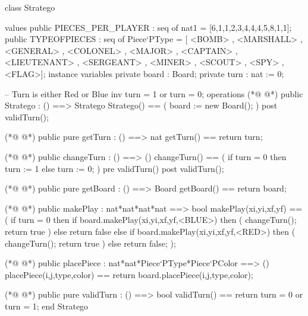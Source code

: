 \begin{vdmpp}[breaklines=true]
class Stratego
  
values
  public PIECES_PER_PLAYER : seq of nat1 = [6,1,1,2,3,4,4,4,5,8,1,1];
  public TYPEOFPIECES : seq of Piece`PType = [ <BOMB> , <MARSHALL> , <GENERAL> , <COLONEL> , <MAJOR> , <CAPTAIN> , <LIEUTENANT> , <SERGEANT> , <MINER> , <SCOUT> , <SPY> , <FLAG>];
instance variables
  private board : Board;
  private turn : nat := 0;
  
  -- Turn is either Red or Blue
  inv turn = 1 or turn = 0;
operations
(*@
\label{Stratego:13}
@*)
  public Stratego : () ==> Stratego
  Stratego() ==
  (
   board := new Board();
  )
  post validTurn();
  
(*@
\label{getTurn:20}
@*)
  public pure getTurn : () ==> nat
  getTurn() == return turn;
  
(*@
\label{changeTurn:23}
@*)
  public changeTurn : () ==> ()
  changeTurn() == 
  (
  if turn = 0 then turn := 1 
   else turn := 0;
  )
  pre validTurn()
  post validTurn();
  
(*@
\label{getBoard:32}
@*)
  public pure getBoard : () ==> Board
  getBoard() == return board;
  
(*@
\label{makePlay:35}
@*)
  public makePlay : nat*nat*nat*nat ==> bool
  makePlay(xi,yi,xf,yf) == (
   if turn = 0 then if board.makePlay(xi,yi,xf,yf,<BLUE>) then 
   (
    changeTurn(); 
    return true
   ) 
    else return false
   else if board.makePlay(xi,yi,xf,yf,<RED>) then 
   (
    changeTurn();
    return true
   ) 
    else return false;
  );
  
(*@
\label{placePiece:51}
@*)
  public placePiece : nat*nat*Piece`PType*Piece`PColor ==> ()
  placePiece(i,j,type,color) == return board.placePiece(i,j,type,color);
  
(*@
\label{validTurn:54}
@*)
  public pure validTurn : () ==> bool
  validTurn() == return turn = 0 or turn = 1;
end Stratego
\end{vdmpp}
